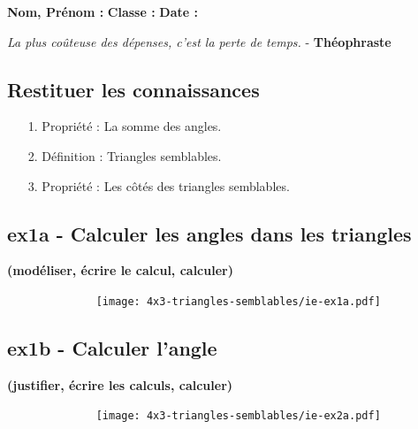 



\textbf{Nom, Prénom :} \hspace{8cm} \textbf{Classe :} \hspace{3cm} \textbf{Date :}\\

\begin{center}
  \textit{La plus coûteuse des dépenses, c’est la perte de temps.}  - \textbf{Théophraste}
\end{center}

\subsection*{Restituer les connaissances}

\begin{enumerate}
  \item[1.] Propriété : La somme des angles. \newline \Pointilles[1]
  \item[2.] Définition : Triangles semblables. \newline \Pointilles[1]
  \item[3.] Propriété : Les côtés des triangles semblables. \newline \Pointilles[1]
\end{enumerate}

\subsection*{ex1a - Calculer les angles dans les triangles}
\textbf{(modéliser, écrire le calcul, calculer)}

\begin{figure}[H]
      \centering
      \texttt{[image: 4x3-triangles-semblables/ie-ex1a.pdf]}
\end{figure}
\Pointilles[2]

\begin{minipage}[t]{0.55\textwidth}
  \subsection*{ex1b - Calculer l'angle}
  \textbf{(justifier, écrire les calculs, calculer)}
  \Pointilles[6]
\end{minipage}
\begin{minipage}[t]{0.4\textwidth}
  \begin{figure}[H]
        \centering
        \texttt{[image: 4x3-triangles-semblables/ie-ex2a.pdf]}
  \end{figure}
\end{minipage}

